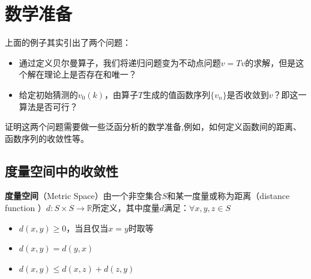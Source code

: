 
\section{数学准备} \label{sec-math-pre}

上面的例子其实引出了两个问题：
\begin{itemize}
    \item 通过定义贝尔曼算子，我们将递归问题变为不动点问题$v=Tv$的求解，但是这个解在理论上是否存在和唯一？
    \item 给定初始猜测的$v_0\left(k\right)$，由算子$T$生成的值函数序列$\{v_n\}$是否收敛到$v$？即这一算法是否可行？
\end{itemize}

证明这两个问题需要做一些泛函分析的数学准备,例如，如何定义函数间的距离、函数序列的收敛性等。


\subsection{度量空间中的收敛性}

\begin{definition}
    \textbf{度量空间}（Metric Space）由一个非空集合$S$和某一度量或称为距离（distance function
    ）$d: S \times S \rightarrow \mathbb{R}$所定义，其中度量$d$满足：$\forall x,y,z \in S$
    \begin{itemize}
        \item $d\left(x,y\right) \geq 0$，当且仅当$x=y$时取等
        \item $d\left(x,y\right) = d\left(y,x\right)$
        \item $d(x,y) \leq d\left(x,z\right)+d\left(z,y\right) $
    \end{itemize}
\end{definition}

